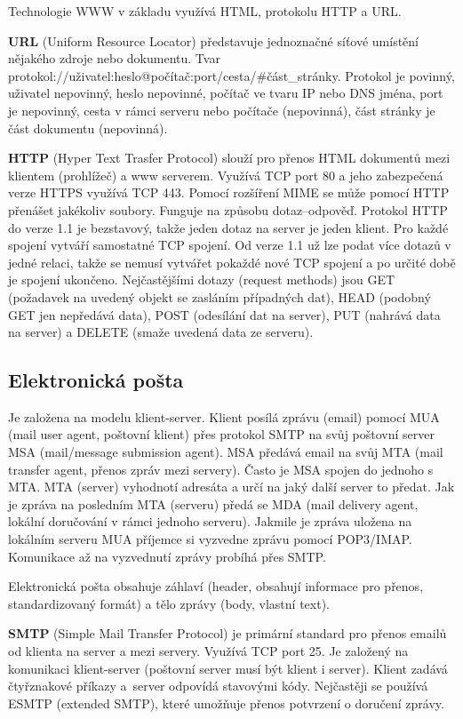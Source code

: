 Technologie WWW v základu využívá HTML, protokolu HTTP a URL.

\textbf{URL} (Uniform Resource Locator) představuje jednoznačné síťové umístění nějakého zdroje nebo dokumentu. Tvar protokol://uživatel:heslo@počítač:port/cesta/\#část\_stránky. Protokol je povinný, uživatel nepovinný, heslo nepovinné, počítač ve tvaru IP nebo DNS jména, port je nepovinný, cesta v rámci serveru nebo počítače (nepovinná), část stránky je část dokumentu (nepovinná).

\textbf{HTTP} (Hyper Text Trasfer Protocol) slouží pro přenos HTML dokumentů mezi klientem (prohlížeč) a www serverem. Využívá TCP port 80 a jeho zabezpečená verze HTTPS využívá TCP 443. Pomocí rozšíření MIME se může pomocí HTTP přenášet jakékoliv soubory. Funguje na způsobu dotaz--odpověď. Protokol HTTP do verze 1.1 je bezstavový, takže jeden dotaz na server je jeden klient. Pro každé spojení vytváří samostatné TCP spojení. Od verze 1.1 už lze podat více dotazů v jedné relaci, takže se nemusí vytvářet pokaždé nové TCP spojení a po určité době je spojení ukončeno. Nejčastějšími dotazy (request methods) jsou GET (požadavek na uvedený objekt se zasláním případných dat), HEAD (podobný GET jen nepředává data), POST (odesílání dat na server), PUT (nahrává data na server) a DELETE (smaže uvedená data ze serveru).

\subsection{Elektronická pošta}

Je založena na modelu klient-server. Klient posílá zprávu (email) pomocí MUA (mail user agent, poštovní klient) přes protokol SMTP na svůj poštovní server MSA (mail/message submission agent). MSA předává email na svůj MTA (mail transfer agent, přenos zpráv mezi servery). Často je MSA spojen do jednoho s MTA. MTA (server) vyhodnotí adresáta a určí na jaký další server to předat. Jak je zpráva na posledním MTA (serveru) předá se MDA (mail delivery agent, lokální doručování v rámci jednoho serveru). Jakmile je zpráva uložena na lokálním serveru MUA příjemce si vyzvedne zprávu pomocí POP3/IMAP. Komunikace až na vyzvednutí zprávy probíhá přes SMTP.

Elektronická pošta obsahuje záhlaví (header, obsahují informace pro přenos, standardizovaný formát) a tělo zprávy (body, vlastní text).

\textbf{SMTP} (Simple Mail Transfer Protocol) je primární standard pro přenos emailů od klienta na server a mezi servery. Využívá TCP port 25. Je založený na komunikaci klient-server (poštovní server musí být klient i server). Klient zadává čtyřznakové příkazy a~server odpovídá stavovými kódy. Nejčastěji se používá ESMTP (extended SMTP), které umožňuje přenos potvrzení o doručení zprávy.


